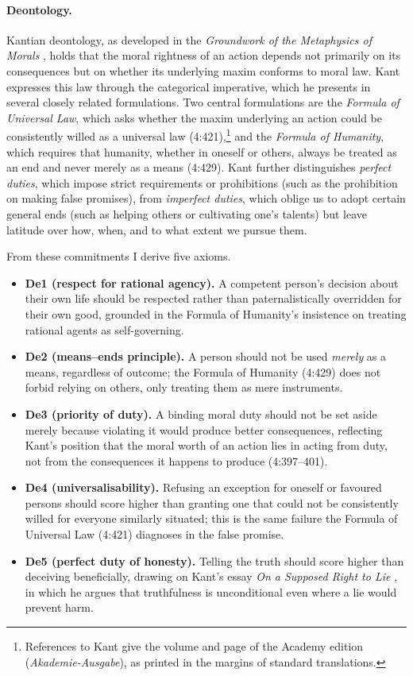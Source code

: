 \documentclass[10pt,twocolumn,a4paper]{article}
\begin{document}
\paragraph{Deontology.} Kantian deontology, as developed in the \emph{Groundwork
of the Metaphysics of Morals} \cite{kant1785}, holds that the moral rightness of
an action depends not primarily on its consequences but on whether its underlying
maxim conforms to moral law. Kant expresses this law through the categorical
imperative, which he presents in several closely related formulations. Two central
formulations are the \emph{Formula of Universal Law}, which asks whether the
maxim underlying an action could be consistently willed as a universal law
(4:421),\footnote{References to Kant give the volume and page of the Academy
edition (\emph{Akademie-Ausgabe}), as printed in the margins of standard
translations.} and the \emph{Formula of Humanity}, which requires that humanity,
whether in oneself or others, always be treated as an end and never merely as a
means (4:429). Kant further distinguishes \emph{perfect duties}, which impose
strict requirements or prohibitions (such as the prohibition on making false
promises), from \emph{imperfect duties}, which oblige us to adopt certain general
ends (such as helping others or cultivating one's talents) but leave latitude
over how, when, and to what extent we pursue them.

From these commitments I derive five axioms.
\begin{itemize}[leftmargin=*, itemsep=2pt, topsep=2pt]
  \item \textbf{De1 (respect for rational agency).} A competent person's
  decision about their own life should be respected rather than
  paternalistically overridden for their own good, grounded in the Formula of
  Humanity's insistence on treating rational agents as self-governing.
  \item \textbf{De2 (means--ends principle).} A person should not be used
  \emph{merely} as a means, regardless of outcome; the Formula of Humanity
  (4:429) does not forbid relying on others, only treating them as mere
  instruments.
  \item \textbf{De3 (priority of duty).} A binding moral duty should not be set
  aside merely because violating it would produce better consequences,
  reflecting Kant's position that the moral worth of an action lies in acting
  from duty, not from the consequences it happens to produce (4:397--401).
  \item \textbf{De4 (universalisability).} Refusing an exception for oneself or
  favoured persons should score higher than granting one that could not be
  consistently willed for everyone similarly situated; this is the same failure
  the Formula of Universal Law (4:421) diagnoses in the false promise.
  \item \textbf{De5 (perfect duty of honesty).} Telling the truth should score
  higher than deceiving beneficially, drawing on Kant's essay \emph{On a
  Supposed Right to Lie} \cite{kant1797}, in which he argues that truthfulness
  is unconditional even where a lie would prevent harm.
\end{itemize}
\end{document}
